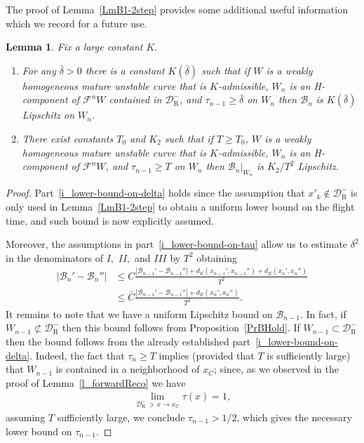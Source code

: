 \documentclass[10pt]{amsart}
\newtheorem{lemm}[theo]{Lemma}\newtheorem{prop}[theo]{Proposition}\newtheorem{coro}[theo]{Corollary}\newtheorem{conj}[theo]{Conjecture}
\theoremstyle{definition}\newtheorem{defi}[theo]{Definition}\newtheorem{rema}[theo]{Remark}\newtheorem{exam}[theo]{Example}\newtheorem{exem}[theo]{Example}\newtheorem{nota}[theo]{Notation}
\newcommand{\crit}{\mathrm{C}}
\newcommand{\xc}{x_\crit}
\newcommand{\cB}{\mathcal{B}}
\newcommand{\pslope}{\mathcal{B}}
\newcommand{\cm}{\mathcal{F}}
\newcommand{\cell}{\mathcal{D}}
\newcommand{\brC}{\bar{C}}
\newcommand{\brdelta}{\bar{\delta}}
\newcommand{\recoPrivate}{\mathrm{R}}
\newcommand{\reco}{{\cell^-_{\recoPrivate}}}
\newcommand{\ppPrivate}[2]{#1^{#2}}
\newcommand{\prePrivate}[1]{\ppPrivate{#1}{-}}
\newcommand{\prpslope}{\prePrivate{\pslope}}
\newcommand{\admiss}{admissible}
\newcommand*\RmIII{{{I\!\!I\!\!I}}}
\newcommand*\RmII{{{I\!\!I}}}
\renewcommand{\prpslope}{\cB}
\renewcommand{\prpslope}{\cB}
\renewcommand{\prpslope}{\cB}
\newcommand*{\relabel}{\renewcommand{\labelenumi}{(\theenumi)}}
\newcommand*{\alphenumi}{\renewcommand*{\theenumi}{\alph{enumi}}\relabel}
\begin{document}
The proof of Lemma~\ref{LmB1-2step} provides some additional useful information which we record for a future use.
\begin{lemm}\label{LmBHoldAdd}
Fix a large constant $K.$
\begin{enumerate}\alphenumi
\item\label{i_lower-bound-on-delta}
For any $\brdelta > 0$ there is a constant $K(\brdelta)$ such that if $W$ is a weakly homogeneous mature unstable curve that is $K$-\admiss{}, $W_n$ is an H-component of $\cm^n W$ contained in $\reco$, and $\tau_{n-1}\geq \brdelta$ on $W_n$ then $\prpslope_n$ is $K(\brdelta)$ Lipschitz on $W_n$.
\item\label{i_lower-bound-on-tau}
There exist constants $T_0$ and $K_2$ such that if $T\geq T_0$, $W$ is a weakly homogeneous mature unstable curve that is $K$-\admiss{}, $W_n$ is an H-component of $\cm^n W$, and $\tau_{n-1}\geq T$ on $W_n$ then $\prpslope_n|_{W_n}$ is ${K_2}/{T^2}$ Lipschitz.
\end{enumerate}
\end{lemm}
\begin{proof}
Part~\eqref{i_lower-bound-on-delta} holds since the assumption that $x'_k\not\in \reco$ is only used in Lemma~\ref{LmB1-2step} to obtain a uniform lower bound on the flight time, and such bound is now explicitly assumed.

Moreover, the assumptions in part~\eqref{i_lower-bound-on-tau} allow us to estimate $\delta^2$ in the denominators of $I,$ $\RmII,$ and $\RmIII$ by $T^2$ obtaining
\begin{align*}
|\cB_{n}'-\cB_n'' | &\leq C \frac{|\cB_{n-1}'-\cB_{n-1}''|+d_E(x_{n-1}', x_{n-1}'')+d_E(x_{n}', x_{n}'')}{T^2}\\
&\leq \brC \frac{|\cB_{n-1}'-\cB_{n-1}''|+d_E(x_{n}', x_{n}'')}{T^2}.
\end{align*}
It remains to note that we have a uniform Lipschitz bound on $\prpslope_{n-1}$. In fact, if $W_{n-1}\not\subset\reco$ then this bound follows from Proposition~\ref{PrBHold}. If $W_{n-1}\subset\reco$ then the bound follows from the already established part~\eqref{i_lower-bound-on-delta}. Indeed, the fact that $\tau_n\geq T$ implies (provided that $T$ is sufficiently large) that $W_{n-1}$ is contained in a neighborhood of $x_C$; since, as we observed in the proof of Lemma~\ref{l_forwardReco} we have
\begin{align*}
\lim_{\reco\,\ni\,x\to\xc}\tau(x) = 1,
\end{align*}
assuming $T$ sufficiently large, we conclude $\tau_{n-1} > 1/2$, which gives the necessary lower bound on $\tau_{n-1}$.
\end{proof}
\end{document}
